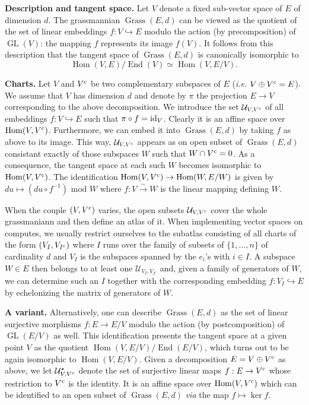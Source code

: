 \documentclass{sig-alternate}
\DeclareMathOperator{\Hom}{Hom}
\DeclareMathOperator{\End}{End}
\DeclareMathOperator{\GL}{GL}
\DeclareMathOperator{\Grass}{Grass}
\begin{document}
\medskip

\noindent
{\bf Description and tangent space.}
Let $V$ denote a fixed sub-vector space of $E$ of dimension $d$. The 
grassmannian $\Grass(E,d)$ can be viewed as the quotient of the set 
of linear embeddings $f: V \hookrightarrow E$ modulo the action (by 
precomposition) of $\GL(V)$: the mapping $f$ represents its image 
$f(V)$. It follows from this description that the tangent space of 
$\Grass(E,d)$ is canonically isomorphic to $$\Hom(V, E) / \End(V) 
\simeq \Hom(V, E/V).$$

\medskip

\noindent
{\bf Charts.}
Let $V$ and $V^{\text{\rm c}}$ be two complementary subspaces of $E$ 
(\emph{i.e.} $V \oplus V^{\text{\rm c}} = E$). We assume that $V$ has 
dimension $d$ and denote by $\pi$ the projection $E \to V$ 
corresponding to the above decomposition. We introduce the set 
$\mathcal U_{V,V^{\text{\rm c}}}$ of all embeddings $f : V \hookrightarrow E$ 
such that $\pi \circ f = \textrm{id}_V$. Clearly it is an affine space over
$\Hom(V,V^\c)$. 
Furthermore, we can embed it into $\Grass(E,d)$ by taking $f$ as
above to its image. This way, $\mathcal U_{V,V^{\text{\rm c}}}$ appears as
on open subset of $\Grass(E,d)$ consistant exactly of those subspaces 
$W$ such that $W \cap V^{\text{\rm c}} = 0$. As a consequence, the tangent space 
at each such $W$ becomes isomorphic to $\Hom(V,V^\c)$. The
identification $\Hom(V,V^\c) \to \Hom(W, E/W)$ is given by
$du \mapsto (du \circ f^{-1}) \text{ mod } W$ where $f : V 
\stackrel{\sim}{\to} W$ is the linear mapping defining $W$.

When the couple $(V, V^{\text{\rm c}})$ varies, the open subsets $\mathcal 
U_{V,V^{\text{\rm c}}}$ cover the whole grassmaniann and then define an atlas 
of it. When implementing vector spaces on computes, we usually restrict 
ourselves to the subatlas consisting of all charts of the form $(V_I, 
V_{I^{\text{\rm c}}})$ where $I$ runs over the family of subsets of $\{1, 
\ldots, n\}$ of cardinality $d$ and $V_I$ is the subspaces spanned by 
the $e_i$'s with $i \in I$. A subspace $W \in E$ then belongs to at 
least one $\mathcal U_{V_I, V_{I^{\text{c}}}}$ and, given a family of
generators of $W$, we can determine such an $I$ together with the
corresponding embedding $f : V_I \hookrightarrow E$ by echelonizing 
the matrix of generators of $W$.

\medskip

\noindent
{\bf A variant.}
Alternatively, one can describe $\Grass(E,d)$ as the set of linear 
surjective morphisms $f : E \to E/V$ modulo the action (by 
postcomposition) of $\GL(E/V)$ as well. This identification presents the 
tangent space at a given point $V$ as the quotient $\Hom(V, E/V) / 
\End(E/V)$, which turns out to be again isomorphic to $\Hom(V, E/V)$. 
Given a decomposition $E = V \oplus V^{\text{\rm c}}$ as above, we let $\mathcal 
U^\star_{V, V^{\text{\rm c}}}$ denote the set of surjective linear maps $f : E 
\to V^{\text{\rm c}}$ whose restriction to $V^{\text{\rm c}}$ is the identity. It is an 
affine space over $\Hom(V, V^\c)$ which can be identified to an open
subset of $\Grass(E,d)$ \emph{via} the map $f \mapsto \ker f$.
\end{document}
